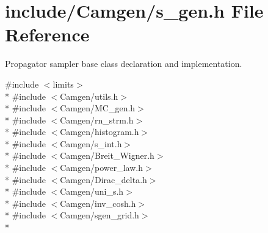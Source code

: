 \hypertarget{a00735}{\section{include/\-Camgen/s\-\_\-gen.h File Reference}
\label{a00735}
}


Propagator sampler base class declaration and implementation.  


{\ttfamily \#include $<$limits$>$}\\*
{\ttfamily \#include $<$Camgen/utils.\-h$>$}\\*
{\ttfamily \#include $<$Camgen/\-M\-C\-\_\-gen.\-h$>$}\\*
{\ttfamily \#include $<$Camgen/rn\-\_\-strm.\-h$>$}\\*
{\ttfamily \#include $<$Camgen/histogram.\-h$>$}\\*
{\ttfamily \#include $<$Camgen/s\-\_\-int.\-h$>$}\\*
{\ttfamily \#include $<$Camgen/\-Breit\-\_\-\-Wigner.\-h$>$}\\*
{\ttfamily \#include $<$Camgen/power\-\_\-law.\-h$>$}\\*
{\ttfamily \#include $<$Camgen/\-Dirac\-\_\-delta.\-h$>$}\\*
{\ttfamily \#include $<$Camgen/uni\-\_\-s.\-h$>$}\\*
{\ttfamily \#include $<$Camgen/inv\-\_\-cosh.\-h$>$}\\*
{\ttfamily \#include $<$Camgen/sgen\-\_\-grid.\-h$>$}\\*
